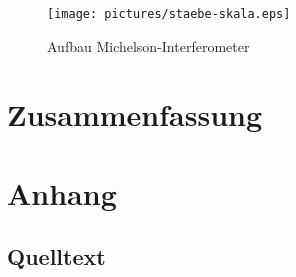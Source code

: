 \documentclass[12pt]{article}
\begin{document}
\begin{figure}[h]
\centering
 \texttt{[image: pictures/staebe-skala.eps]}
 \caption{Aufbau Michelson-Interferometer}
\end{figure}
\section{Zusammenfassung}

\section{Anhang}

\subsection{Quelltext}


\end{document}
